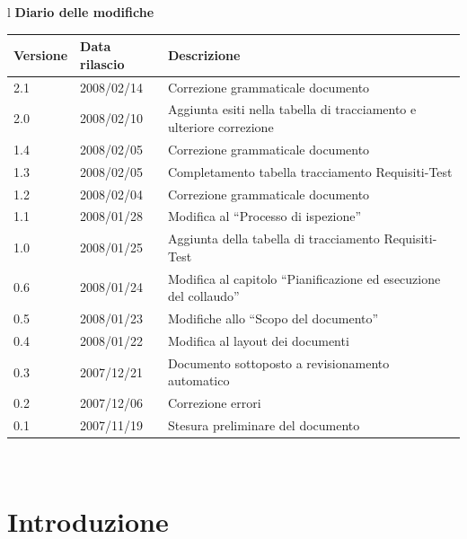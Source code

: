 \documentclass[11pt,titlepage,a4paper]{report}
\begin{document}
\begin{center}
\begin{table}[hbtp]
\large{
\begin{tabular}{l}
\Large{\textbf{\textsf{Diario delle modifiche}}} \\
\begin{tabular}{||p{2cm}||p{3.5cm}||p{6cm}||}
\hline
\textbf{Versione} & \textbf{Data rilascio} & \textbf{Descrizione} \\ \hline
2.1 & 2008/02/14 & Correzione grammaticale documento \\ \hline
2.0 & 2008/02/10 & Aggiunta esiti nella tabella di tracciamento e ulteriore correzione \\ \hline
1.4 & 2008/02/05 & Correzione grammaticale documento \\ \hline
1.3 & 2008/02/05 & Completamento tabella tracciamento Requisiti-Test \\ \hline
1.2 & 2008/02/04 & Correzione grammaticale documento \\ \hline
1.1 & 2008/01/28 & Modifica al ``Processo di ispezione''\\ \hline
1.0 & 2008/01/25 & Aggiunta della tabella di tracciamento Requisiti-Test\\ \hline
0.6 & 2008/01/24 & Modifica al capitolo ``Pianificazione ed esecuzione del collaudo''\\ \hline
0.5 & 2008/01/23 & Modifiche allo ``Scopo del documento''\\ \hline
0.4 & 2008/01/22 & Modifica al layout dei documenti\\ \hline
0.3 & 2007/12/21 & Documento sottoposto a revisionamento automatico\\ \hline
0.2 & 2007/12/06 & Correzione errori \\ \hline
0.1 & 2007/11/19 & Stesura preliminare del documento \\ \hline
\end{tabular} \\
\end{tabular}

}
\end{table}
\end{center}

\tableofcontents

\chapter{Introduzione}
\end{document}
